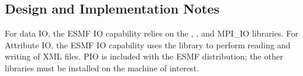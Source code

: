 
\subsection{Design and Implementation Notes}

For data IO, the ESMF IO capability relies on the 
, 
, 
and MPI\_IO libraries.  For Attribute IO, the ESMF IO capability uses the 
 library to 
perform reading and writing of XML files.  PIO is included with the ESMF 
distribution; the other libraries must be installed on the machine of interest.
